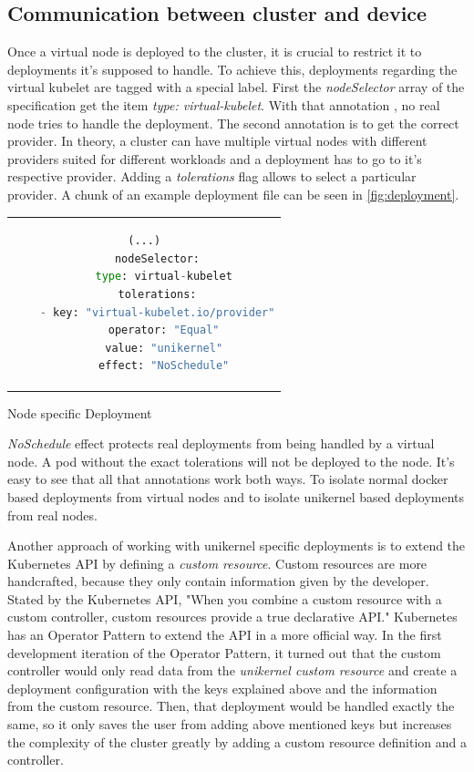 \subsection{Communication between cluster and device}
Once a virtual node is deployed to the cluster, it is crucial to restrict it to deployments it's supposed to handle. To achieve this, deployments regarding the virtual kubelet are tagged with a special label. First the \textit{nodeSelector} array of the specification get the item \textit{type: virtual-kubelet}. With that annotation , no real node tries to handle the deployment. The second annotation is to get the correct provider. In theory, a cluster can have multiple virtual nodes with different providers suited for different workloads and a deployment has to go to it's respective provider. Adding a \textit{tolerations} flag allows to select a particular provider. A chunk of an example deployment file can be seen in \ref{fig:deployment}.

\begin{code}[htpb]
  \centering
  \begin{tabular}{c}
  \begin{lstlisting}[language=python]
    (...)
    nodeSelector:
      type: virtual-kubelet
    tolerations:
    - key: "virtual-kubelet.io/provider"
      operator: "Equal"
      value: "unikernel"
      effect: "NoSchedule"
\end{lstlisting}
\end{tabular}
\caption{Node specific Deployment}\label{fig:deployment}
\end{code}
\textit{NoSchedule} effect protects real deployments from being handled by a virtual node. A pod without the exact tolerations will not be deployed to the node. It's easy to see that all that annotations work both ways. To isolate normal docker based deployments from virtual nodes and to isolate unikernel based deployments from real nodes.

Another approach of working with unikernel specific deployments is to extend the Kubernetes API by defining a \textit{custom resource}. Custom resources are more handcrafted, because they only contain information given by the developer. Stated by the Kubernetes API, "When you combine a custom resource with a custom controller, custom resources provide a true declarative API." Kubernetes has an Operator Pattern to extend the API in a more official way. In the first development iteration of the Operator Pattern, it turned out that the custom controller would only read data from the \textit{unikernel custom resource} and create a deployment configuration with the keys explained above and the information from the custom resource. Then, that deployment would be handled exactly the same, so it only saves the user from adding above mentioned keys but increases the complexity of the cluster greatly by adding a custom resource definition and a controller.

